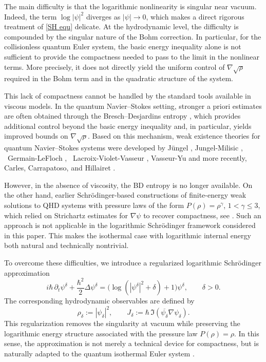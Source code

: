 \documentclass[11pt]{article}
\begin{document}
\medskip

The main difficulty is that the logarithmic nonlinearity is singular near vacuum. Indeed, the term $\log |\psi|^2$ diverges as $|\psi|\to 0$, which makes a direct rigorous treatment of \eqref{SH equ} delicate. At the hydrodynamic level, the difficulty is compounded by the singular nature of the Bohm correction. In particular, for the collisionless quantum Euler system, the basic energy inequality alone is not sufficient to provide the compactness needed to pass to the limit in the nonlinear terms. More precisely, it does not directly yield the uniform control of $\nabla\sqrt{\rho}$ required in the Bohm term and in the quadratic structure of the system.

\medskip


This lack of compactness cannot be handled by the standard tools available in viscous models. In the quantum Navier--Stokes setting, stronger a priori estimates are often obtained through the Bresch--Desjardins entropy \cite{BD,BreschDesjardins2006}, which provides additional control beyond the basic energy inequality and, in particular, yields improved bounds on $\nabla\sqrt{\rho}$. 
Based on this mechanism, weak existence theories for quantum Navier--Stokes systems were developed by
J\"ungel \cite{J1,Jungel2010}, Jungel-Milisic \cite{JM}, ~Germain-LeFloch \cite{GermainLeFloch2016},
~Lacroix-Violet-Vasseur \cite{
LacroixVioletVasseur2018},
Vasseur-Yu \cite{VasseurYu2016QNS}  and more recently, Carles, Carrapatoso, and Hillairet \cite{CarlesCarrapatosoHillairet2022}.
\medskip

However, in the absence of viscosity, the BD entropy is no longer available. On the other hand, earlier Schr\"odinger-based constructions of finite-energy weak solutions to QHD systems with pressure laws of the form \(P(\rho)=\rho^\gamma\), \(1<\gamma\leq 3\),  which relied on Strichartz estimates for $\nabla \psi$ to recover compactness, see \cite{AntonelliMarcati2009, AntonelliMarcati2012}. Such an approach is not applicable in the logarithmic Schr\"odinger framework considered in this paper. This makes the isothermal case with logarithmic internal energy both natural and technically nontrivial.






\medskip


To overcome these difficulties, we introduce a regularized logarithmic Schr\"odinger approximation
\begin{equation}\label{eq:intro-reg}
i\hbar\,\partial_t\psi^\delta+\frac{\hbar^2}{2}\Delta\psi^\delta
=
\bigl(\log(|\psi^\delta|^2+\delta)+1\bigr)\psi^\delta,
\qquad \delta>0.
\end{equation}
The corresponding hydrodynamic observables are defined by
\[
\rho_\delta:=|\psi_\delta|^2,
\qquad
J_\delta:=\hbar\,\Im(\overline{\psi_\delta}\nabla\psi_\delta).
\]
This regularization removes the singularity at vacuum while preserving the logarithmic energy structure associated with the pressure law $P(\rho)=\rho$. In this sense, the approximation is not merely a technical device for compactness, but is naturally adapted to the quantum isothermal Euler system \cite{BaoCarlesSuTang2019}.
\end{document}
